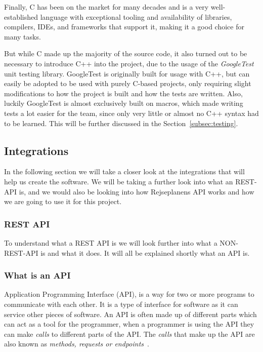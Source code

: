 Finally, C has been on the market for many decades and is a very well-established language with exceptional tooling and
availability of libraries, compilers, IDEs, and frameworks that support it, making it a good choice for many tasks.

But while C made up the majority of the source code, it also turned out to be necessary to introduce C++ into the
project, due to the usage of the \textit{GoogleTest} unit testing library.
GoogleTest is originally built for usage with C++, but can easily be adopted to be used with purely C-based projects,
only requiring slight modifications to how the project is built and how the tests are written.
Also, luckily GoogleTest is almost exclusively built on macros, which made writing tests a lot easier for the team,
since only very little or almost no C++ syntax had to be learned.
This will be further discussed in the Section~\ref{subsec:testing}.

\subsection{Integrations}\label{subsec:integrations}

In the following section we will take a closer look at the integrations that will help us create the software.
We will be taking a further look into what an REST-API is, and we would also be looking into how Rejseplanens API works
and how we are going to use it for this project.

\subsubsection{\uppercase{Rest API}}\label{subsubsec:rest-api}

To understand what a REST API is we will look further into what a NON-REST-API is and what it does.
It will all be explained shortly what an API is.

\subsubsection{What is an API}\label{subsubsec:what-is-an-api}

Application Programming Interface (API), is a way for two or more programs to communicate with each other.
It is a type of interface for software as it can service other pieces of software.
An API is often made up of different parts which can act as a tool for the programmer, when a programmer is using the
API they can make \textit{calls} to different parts of the API\@.
The \textit{calls} that make up the API are also known as \textit{methods, requests or endpoints}~\cite{APIwiki}.

